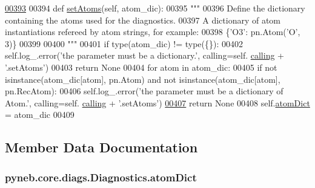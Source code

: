 \begin{DoxyCode}
\hypertarget{classpyneb_1_1core_1_1diags_1_1_diagnostics_l00393}{}\hyperlink{classpyneb_1_1core_1_1diags_1_1_diagnostics_a7eb28ac8852ba834dd3d23cd6113d27a}{00393} 
00394     \textcolor{keyword}{def }\hyperlink{classpyneb_1_1core_1_1diags_1_1_diagnostics_a7eb28ac8852ba834dd3d23cd6113d27a}{setAtoms}(self, atom\_dic):
00395         \textcolor{stringliteral}{"""}
00396 \textcolor{stringliteral}{        Define the dictionary containing the atoms used for the diagnostics.}
00397 \textcolor{stringliteral}{        A dictionary of atom instantiations refereed by atom strings, for example:}
00398 \textcolor{stringliteral}{        \{'O3': pn.Atom('O', 3)\}}
00399 \textcolor{stringliteral}{        }
00400 \textcolor{stringliteral}{        """}
00401         \textcolor{keywordflow}{if} type(atom\_dic) != type(\{\}):
00402             self.log\_.error(\textcolor{stringliteral}{'the parameter must be a dictionary.'}, calling=self.
      \hyperlink{classpyneb_1_1core_1_1diags_1_1_diagnostics_a07dce673fec8b2383ef411ab94b0b2fe}{calling} + \textcolor{stringliteral}{'.setAtoms'})
00403             \textcolor{keywordflow}{return} \textcolor{keywordtype}{None}
00404         \textcolor{keywordflow}{for} atom \textcolor{keywordflow}{in} atom\_dic:
00405             \textcolor{keywordflow}{if} \textcolor{keywordflow}{not} isinstance(atom\_dic[atom], pn.Atom) \textcolor{keywordflow}{and} \textcolor{keywordflow}{not} isinstance(atom\_dic[atom], pn.RecAtom):
00406                 self.log\_.error(\textcolor{stringliteral}{'the parameter must be a dictionary of Atom.'}, calling=self.
      \hyperlink{classpyneb_1_1core_1_1diags_1_1_diagnostics_a07dce673fec8b2383ef411ab94b0b2fe}{calling} + \textcolor{stringliteral}{'.setAtoms'})
\hypertarget{classpyneb_1_1core_1_1diags_1_1_diagnostics_l00407}{}\hyperlink{classpyneb_1_1core_1_1diags_1_1_diagnostics_a36301f268745b33abe6cfeb3e41a6356}{00407}                 \textcolor{keywordflow}{return} \textcolor{keywordtype}{None}
00408         self.\hyperlink{classpyneb_1_1core_1_1diags_1_1_diagnostics_a36301f268745b33abe6cfeb3e41a6356}{atomDict} = atom\_dic
00409     
    
\end{DoxyCode}


\subsection{Member Data Documentation}
\hypertarget{classpyneb_1_1core_1_1diags_1_1_diagnostics_a36301f268745b33abe6cfeb3e41a6356}{
\subsubsection[{atom\-Dict}]{\setlength{\rightskip}{0pt plus 5cm}pyneb.\-core.\-diags.\-Diagnostics.\-atom\-Dict}}\label{classpyneb_1_1core_1_1diags_1_1_diagnostics_a36301f268745b33abe6cfeb3e41a6356}


